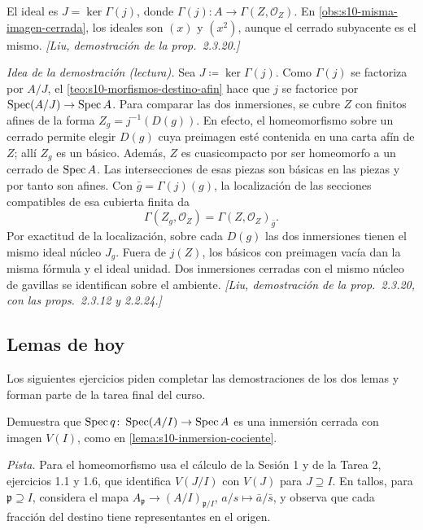 \begin{obs}
\label{obs:s10-ideal-cerrado}
El ideal es \(J=\ker\Gamma(j)\), donde \(\Gamma(j)\colon A\to\Gamma(Z,\mathcal O_Z)\). En \cref{obs:s10-misma-imagen-cerrada}, los ideales son \((x)\) y \((x^2)\), aunque el cerrado subyacente es el mismo. \emph{[Liu, demostración de la prop.~2.3.20.]}
\end{obs}

\emph{Idea de la demostración (lectura).} Sea \(J\coloneqq\ker\Gamma(j)\). Como \(\Gamma(j)\) se factoriza por \(A/J\), el \cref{teo:s10-morfismos-destino-afin} hace que \(j\) se factorice por \(\operatorname{Spec}(A/J)\to\operatorname{Spec} A\). Para comparar las dos inmersiones, se cubre \(Z\) con finitos afines de la forma \(Z_g=j^{-1}(D(g))\). En efecto, el homeomorfismo sobre un cerrado permite elegir \(D(g)\) cuya preimagen esté contenida en una carta afín de \(Z\); allí \(Z_g\) es un básico. Además, \(Z\) es cuasicompacto por ser homeomorfo a un cerrado de \(\operatorname{Spec} A\). Las intersecciones de esas piezas son básicas en las piezas y por tanto son afines. Con \(\bar g=\Gamma(j)(g)\), la localización de las secciones compatibles de esa cubierta finita da
\[
 \Gamma(Z_g,\mathcal O_Z)=\Gamma(Z,\mathcal O_Z)_{\bar g}.
\]
Por exactitud de la localización, sobre cada \(D(g)\) las dos inmersiones tienen el mismo ideal núcleo \(J_g\). Fuera de \(j(Z)\), los básicos con preimagen vacía dan la misma fórmula y el ideal unidad. Dos inmersiones cerradas con el mismo núcleo de gavillas se identifican sobre el ambiente. \emph{[Liu, demostración de la prop.~2.3.20, con las props.~2.3.12 y 2.2.24.]}

\subsection*{Lemas de hoy}

Los siguientes ejercicios piden completar las demostraciones de los dos lemas y forman parte de la tarea final del curso.

\begin{ejer}
\label{ejer:s10-inmersion-cociente}
Demuestra que \(\operatorname{Spec} q\colon\operatorname{Spec}(A/I)\to\operatorname{Spec} A\) es una inmersión cerrada con imagen \(V(I)\), como en \cref{lema:s10-inmersion-cociente}.

\emph{Pista.} Para el homeomorfismo usa el cálculo de la Sesión 1 y de la Tarea 2, ejercicios 1.1 y 1.6, que identifica \(V(J/I)\) con \(V(J)\) para \(J\supseteq I\). En tallos, para \(\mathfrak p\supseteq I\), considera el mapa \(A_{\mathfrak p}\to(A/I)_{\mathfrak p/I}\), \(a/s\mapsto\bar a/\bar s\), y observa que cada fracción del destino tiene representantes en el origen.
\end{ejer}

